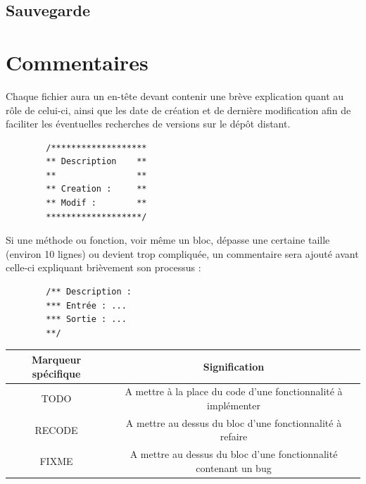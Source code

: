 \documentclass[a4paper]{article}
\newcommand{\alinea}{\hspace*{0.5cm}}
\begin{document}
      \subsection{Sauvegarde}
      
    \section{Commentaires}
      \alinea Chaque fichier aura un en-tête devant contenir une brève explication quant au rôle de celui-ci, ainsi que les date de création et de dernière modification afin de faciliter les éventuelles recherches de versions sur le dépôt distant.\\
      \begin{verbatim}
        /*******************
        ** Description    **
        **                **
        ** Creation :     **
        ** Modif :        **
        *******************/
      \end{verbatim}
      \alinea Si une méthode ou fonction, voir même un bloc, dépasse une certaine taille (environ 10 lignes) ou devient trop compliquée, un commentaire sera ajouté avant celle-ci expliquant brièvement son processus :
      \begin{verbatim}
        /** Description :
        *** Entrée : ...
        *** Sortie : ...
        **/
      \end{verbatim}
      \begin{small}
        \begin{tabular}{| c | c |}
          \hline
          \textbf{Marqueur spécifique} & \textbf{Signification}\\
          \hline
          TODO & A mettre à la place du code d'une fonctionnalité à implémenter\\
          \hline
          RECODE & A mettre au dessus du bloc d'une fonctionnalité à refaire\\
          \hline
          FIXME & A mettre au dessus du bloc d'une fonctionnalité contenant un bug\\
          \hline
        \end{tabular}
      \end{small}
\end{document}

